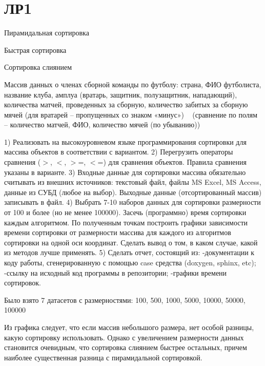 \chapter{ЛР1}
\hypertarget{md__r_e_a_d_m_e}{}\label{md__r_e_a_d_m_e}
\label{md__r_e_a_d_m_e_autotoc_md0}%
%

\begin{DoxyItemize}
\item Пирамидальная сортировка
\item Быстрая сортировка
\item Сортировка слиянием
\end{DoxyItemize}

Массив данных о членах сборной команды по футболу\+: страна, ФИО футболиста, название клуба, амплуа (вратарь, защитник, полузащитник, нападающий), количества матчей, проведенных за сборную, количество забитых за сборную мячей (для вратарей – пропущенных со знаком «минус») ~\newline
 (сравнение по полям – количество матчей, ФИО, количество мячей (по убыванию))

1) Реализовать на высокоуровневом языке программирования сортировки для массива объектов в соответствии с вариантом. 2) Перегрузить операторы сравнения (\texorpdfstring{$>$}{>}, \texorpdfstring{$<$}{<}, \texorpdfstring{$>$}{>}=, \texorpdfstring{$<$}{<}=) для сравнения объектов. Правила сравнения указаны в варианте. 3) Входные данные для сортировки массива обязательно считывать из внешних источников\+: текстовый файл, файлы MS Excel, MS Access, данные из СУБД (любое на выбор). Выходные данные (отсортированный массив) записывать в файл. 4) Выбрать 7-\/10 наборов данных для сортировки размерности от 100 и более (но не менее 100000). Засечь (программно) время сортировки каждым алгоритмом. По полученным точкам построить графики зависимости времени сортировки от размерности массива для каждого из алгоритмов сортировки на одной оси координат. Сделать вывод о том, в каком случае, какой из методов лучше применять. 5) Сделать отчет, состоящий из\+: -\/документации к коду работы, сгенерированную с помощью case средства (doxygen, sphinx, etc); -\/ссылку на исходный код программы в репозитории; -\/графики времени сортировок.

Было взято 7 датасетов с размерностями\+: 100, 500, 1000, 5000, 10000, 50000, 100000



Из графика следует, что если массив небольшого размера, нет особой разницы, какую сортировку использовать. Однако с увеличением размерности данных становится очевидным, что сортировка слиянием быстрее остальных, причем наиболее существенная разница с пирамидальной сортировкой. 